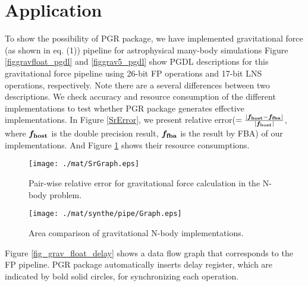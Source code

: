 \documentclass{llncs}
\begin{document}
\section{Application}
\label{Sec_Appli}
To show the possibility of PGR package, we have implemented gravitational
force (as shown in eq. (1)) pipeline for astrophysical many-body simulations
Figure \ref{figgravfloat_pgdl} and \ref{figgrav5_pgdl}
show PGDL descriptions for this gravitational force pipeline
using 26-bit FP operations and 17-bit LNS operations, respectively.
Note there are a several differences between two descriptions.
We check accuracy and resource consumption of the different implementations 
to test whether PGR package generates effective implementations.
In Figure \ref{SrError}, we present relative error($=\frac{|\vec{f_{\rm host}}-\vec{f_{\rm fba}}|}{|\vec{f_{\rm host}}|}$, where $\vec{f_{\rm host}}$ is the double precision result, $\vec{f_{\rm fba}}$ is the result by FBA) of our implementations.
And Figure \ref{AreaComp} shows their resource consumptions.

\begin{figure}[htb]
  \begin{center}
    \begin{minipage}{.45\linewidth}
      \texttt{[image: ./mat/SrGraph.eps]}
      \caption{Pair-wise relative error for gravitational force calculation in the N-body problem.}
      \label{SrError}
    \end{minipage}
    \hspace{2.3pc}
    \begin{minipage}{.45\linewidth}
      \texttt{[image: ./mat/synthe/pipe/Graph.eps]}
      \caption{Area comparison of gravitational N-body implementations.}
      \label{AreaComp}
    \end{minipage}
  \end{center}
\end{figure}

Figure \ref{fig_grav_float_delay} shows a data flow graph that corresponds to the FP pipeline.
PGR package automatically inserts delay register, which are indicated by bold solid circles,
for synchronizing each operation.
\end{document}
